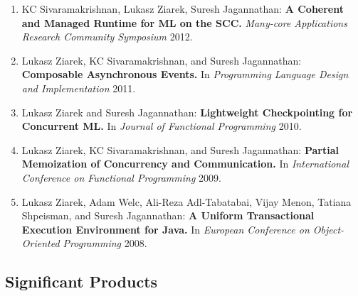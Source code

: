 \documentclass[times,11pt]{article}
\begin{document}
\noindent
\begin{enumerate}\setlength{\itemsep}{\myspace}

\item KC Sivaramakrishnan, Lukasz Ziarek, Suresh Jagannathan:
{\bf A Coherent and Managed Runtime for ML on the SCC.}
{\it Many-core Applications Research Community Symposium} 2012.

\item Lukasz Ziarek, KC Sivaramakrishnan, and Suresh Jagannathan:
{\bf Composable Asynchronous Events.}
In \emph{Programming Language Design and Implementation} 2011.

\item Lukasz Ziarek and Suresh Jagannathan:
{\bf Lightweight Checkpointing for Concurrent ML.} 
In \emph{ Journal of Functional Programming} 2010.

\item  Lukasz Ziarek, KC Sivaramakrishnan, and Suresh Jagannathan:
{\bf Partial Memoization of Concurrency and Communication.} 
In \emph{International Conference on Functional Programming} 2009.

\item Lukasz Ziarek, Adam Welc, Ali-Reza Adl-Tabatabai, Vijay Menon, 
Tatiana Shpeisman, and Suresh Jagannathan:
{\bf A Uniform Transactional Execution Environment for Java.} 
In \emph{European Conference on Object-Oriented Programming} 2008.  

\end{enumerate}


\subsection*{Significant Products}
\end{document}
